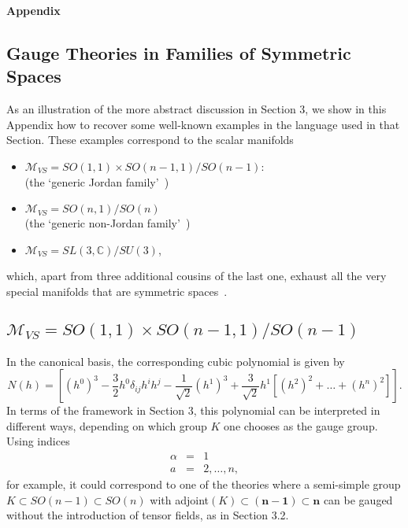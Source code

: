 \documentclass[a4paper,11pt]{article}
\newcommand{\M}{\ensuremath{\mathcal{M}}}
\renewcommand{\theequation}{\thesection.\arabic{equation}}
\begin{document}
\vspace{0.5cm}


\noindent
{\bf\Large Appendix}

\begin{appendix}
\section{Gauge Theories in Families of Symmetric Spaces}

\renewcommand{\theequation}{A.\arabic{equation}}




As an illustration of the more abstract discussion in Section 3,
we show in this Appendix how to recover some well-known examples in the
language used in that Section. These examples correspond to the
scalar manifolds
\begin{itemize}
\item $\M_{VS}=SO(1,1)\times SO(n-1,1)/SO(n-1)$:\\
 (the `generic Jordan family'~\cite{GST1})
\item $\M_{VS}=SO(n,1)/SO(n)$\\
 (the `generic non-Jordan family'~\cite{GST3})
\item $\M_{VS}=SL(3,\mathbb{C})/SU(3)$,
\end{itemize}
which, apart from three additional cousins of the last one,
exhaust all the very special manifolds that are symmetric
spaces~\cite{GST3,dWvP1}.

\subsection{ $\M_{VS}=SO(1,1)\times SO(n-1,1)/SO(n-1)$}
In the canonical basis, the corresponding cubic polynomial is
given by
\begin{equation}
N(h)=\left[(h^{0})^{3}-\frac{3}{2}h^{0}
\delta_{ij}h^{i}h^{j}-\frac{1}{\sqrt{2}}(h^{1})^{3}
+\frac{3}{\sqrt{2}} h^{1}[(h^{2})^{2}+\ldots +(h^{n})^{2}]\right].
\label{gJ}
\end{equation}
In terms of the framework in Section 3, this polynomial can be
interpreted in different ways, depending on which group $K$ one
chooses as the gauge group. Using indices
\begin{eqnarray}
\alpha&=& 1\nonumber\\
a&=&2,\ldots,n,\nonumber
\end{eqnarray}
for example, it could correspond to one of the theories where a
semi-simple group $K \subset SO(n-1)\subset SO(n)$ with
adjoint$(K)\subset \mathbf{(n-1)}\subset \mathbf{n}$ can be gauged
without the introduction of tensor fields, as in Section 3.2.



\end{appendix}
\end{document}
